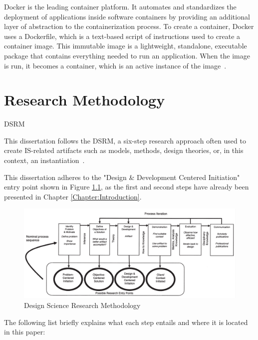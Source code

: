 \documentclass[12pt, reqno, oneside]{amsbook}
\makeatletter
\def\section{\@startsection{section}{1}%
      \z@{.5\linespacing\@plus.7\linespacing}{.25\linespacing}%
      {\normalfont\bfseries\flushleft}}
\theoremstyle{definition}
\theoremstyle{definition}
\numberwithin{section}{chapter}
\numberwithin{table}{chapter}
\numberwithin{figure}{chapter}
\makeatother
\begin{document}
Docker is the leading container platform. It automates and standardizes the deployment of applications inside software containers by providing an additional layer of abstraction to the containerization process. To create a container, Docker uses a Dockerfile, which is a text-based script of instructions used to create a container image. This immutable image is a lightweight, standalone, executable package that contains everything needed to run an application. When the image is run, it becomes a container, which is an active instance of the image~\cite{Figueira2024, Hardikar2021, Potdar2020}.


\chapter{Research Methodology}
\label{Chapter:Research_Methodology}

\section{\texorpdfstring{\ac{DSRM}}{DSRM}}

This dissertation follows the \ac{DSRM}, a six-step research approach often used to create \ac{IS}-related artifacts such as models, methods, design theories, or, in this context, an instantiation~\cite{Peffers2007}.

This dissertation adheres to the "Design \& Development Centered Initiation" entry point shown in Figure \ref{Figure:DSRM}, as the first and second steps have already been presented in Chapter \ref{Chapter:Introduction}.

\begin{figure}[H]
  \centering
  \includegraphics[width=1\linewidth]{images/DSRM_process_model.png}
  \caption{\label{Figure:DSRM}Design Science Research Methodology~\cite{Peffers2007}}
\end{figure}

The following list briefly explains what each step entails and where it is located in this paper:
\end{document}
